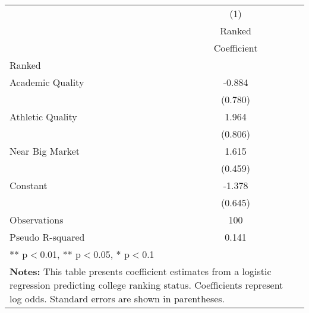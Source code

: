 \begin{tabular}{l*{2}{c}}
\hline\hline
                    &\multicolumn{1}{c}{(1)}\\
                    &\multicolumn{1}{c}{Ranked }\\
                    & Coefficient         \\
\hline
Ranked &                     \\
Academic Quality    &      -0.884         \\
                    &       (0.780)         \\
Athletic Quality    &       1.964\sym{**} \\
                    &       (0.806)         \\
Near Big Market     &       1.615\sym{***}\\
                    &       (0.459)         \\
Constant            &      -1.378\sym{**} \\
                    &       (0.645)         \\
\hline
Observations        &         100         \\
Pseudo R-squared    &       0.141         \\
\hline\hline
\multicolumn{2}{p{0.6\linewidth}}{\small *** p$<$0.01, ** p$<$0.05, * p$<$0.1} \\
\multicolumn{2}{p{0.6\linewidth}}{\small \textbf{Notes:} This table presents coefficient estimates from a logistic regression predicting college ranking status. Coefficients represent log odds. Standard errors are shown in parentheses. } \\
\end{tabular}


